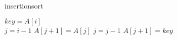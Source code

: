 \documentclass[a4paper]{article}
\begin{document}
\begin{algorithm}
  \caption{insertionsort}
  \begin{algorithmic}[1]
    \State $key = A[i]$ \\
    \State $j = i - 1$
    \State $A[j + 1] = A[j]$
    \State $j = j - 1$
    \EndWhile
    \State $A[j + 1] = key$
    \EndFor
    \EndFunction
  \end{algorithmic}
\end{algorithm}
\end{document}
